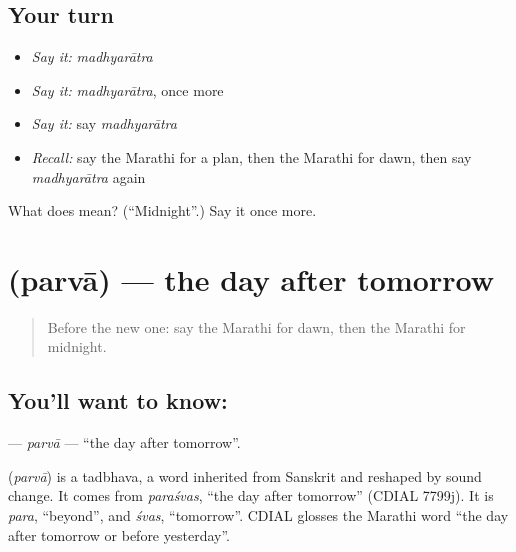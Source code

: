 \subsection*{Your turn}
\begin{itemize}
\raggedright
  \item \emph{Say it:} \emph{madhyarātra}
  \item \emph{Say it:} \emph{madhyarātra}, once more
  \item \emph{Say it:} say \emph{madhyarātra}
  \item \emph{Recall:} say the Marathi for a plan, then the Marathi for dawn, then say \emph{madhyarātra} again
\end{itemize}

\begin{tcolorbox}[breakable,colback=teal!4,colframe=teal!35!black,title={Before you move on}]
What does  mean? (\textquotedblleft{}Midnight\textquotedblright{}.) Say it once more.
\end{tcolorbox}
\section[\texorpdfstring{\mr{परवा} (parvā)}{परवा (parvā)}]{ (parvā) — the day after tomorrow}

\label{lesson:MR-C124-parva}



\begin{quote}
Before the new one: say the Marathi for dawn, then the Marathi for midnight.
\end{quote}

\subsection*{You'll want to know: }
\textbf{} — \emph{parvā} — \textquotedblleft{}the day after tomorrow\textquotedblright{}.

\begin{cousinweb}
\textbf{} (\emph{parvā}) is a tadbhava, a word inherited from Sanskrit and reshaped by sound change. It comes from \emph{paraśvas}, \textquotedblleft{}the day after tomorrow\textquotedblright{} (CDIAL 7799j). It is \emph{para}, \textquotedblleft{}beyond\textquotedblright{}, and \emph{śvas}, \textquotedblleft{}tomorrow\textquotedblright{}. CDIAL glosses the Marathi word \textquotedblleft{}the day after tomorrow or before yesterday\textquotedblright{}.
\end{cousinweb}

